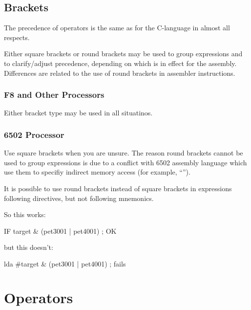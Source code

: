 \subsection{Brackets}
\label{changelog:20200908brackets}

The precedence of operators is the same as for the C-language in almost all respects.  

Either square brackets \mono{[]} or round brackets \mono{()} may be used to group expressions and to clarify/adjust precedence, depending on which  is in effect for the assembly. Differences are related to the use of round brackets in assembler instructions. 

\subsubsection{F8 and Other Processors}
Either bracket type may be used in all situatinos.

\subsubsection{6502 Processor}

Use square brackets \mono{[]} when you are unsure. The reason round brackets \mono{()} cannot be used to
group expressions is due to a conflict with 6502 assembly language which use them to specifiy indirect memory access (for example, ``'').

It is possible to use round brackets \mono{()} instead of square brackets \mono{[]} in expressions following directives, but not following mnemonics.

So this works:

\begin{code}[caption=Valid Bracket Usage]
    IF target & (pet3001 | pet4001) ; OK
\end{code}

but this doesn't:

\begin{code}[caption=Invalid Bracket Usage]
    lda #target & (pet3001 | pet4001) ; fails
\end{code}

\section{Operators}
	
